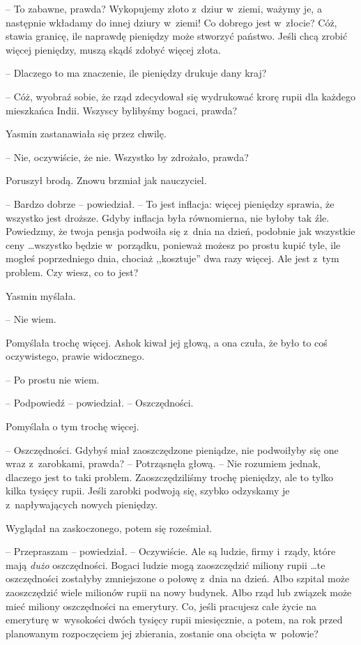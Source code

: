 \documentclass[oneside,polish,11pt,rmheadings]{mwbk}
\begin{document}
-- To zabawne, prawda? Wykopujemy złoto z~dziur w~ziemi, ważymy je, a następnie wkładamy do innej dziury w~ziemi! Co dobrego jest w~złocie? Cóż, stawia granicę, ile naprawdę pieniędzy może stworzyć państwo. Jeśli chcą zrobić więcej pieniędzy, muszą skądś zdobyć więcej złota. 

-- Dlaczego to ma znaczenie, ile pieniędzy drukuje dany kraj?

-- Cóż, wyobraź sobie, że rząd zdecydował się wydrukować krorę rupii dla każdego mieszkańca Indii. Wszyscy bylibyśmy bogaci, prawda?

Yasmin zastanawiała się przez chwilę. 

-- Nie, oczywiście, że nie. Wszystko by zdrożało, prawda?

Poruszył brodą. Znowu brzmiał jak nauczyciel. 

-- Bardzo dobrze -- powiedział. -- To jest inflacja: więcej pieniędzy sprawia, że wszystko jest droższe. Gdyby inflacja była równomierna, nie byłoby tak źle. Powiedzmy, że twoja pensja podwoiła się z~dnia na dzień, podobnie jak wszystkie ceny  \ldots  wszystko będzie w~porządku, ponieważ możesz po prostu kupić tyle, ile mogłeś poprzedniego dnia, chociaż ,,kosztuje'' dwa razy więcej. Ale jest z~tym problem. Czy wiesz, co to jest?

Yasmin myślała. 

-- Nie wiem. 

Pomyślała trochę więcej. Ashok kiwał jej głową, a ona czuła, że było to coś oczywistego, prawie widocznego. 

-- Po prostu nie wiem.

-- Podpowiedź -- powiedział. -- Oszczędności. 

Pomyślała o tym trochę więcej. 

-- Oszczędności. Gdybyś miał zaoszczędzone pieniądze, nie podwoiłyby się one wraz z~zarobkami, prawda? -- Potrząsnęła głową. -- Nie rozumiem jednak, dlaczego jest to taki problem. Zaoszczędziliśmy trochę pieniędzy, ale to tylko kilka tysięcy rupii. Jeśli zarobki podwoją się, szybko odzyskamy je z~napływających nowych pieniędzy.

Wyglądał na zaskoczonego, potem się roześmiał. 

-- Przepraszam -- powiedział. -- Oczywiście. Ale są ludzie, firmy i~rządy, które mają \textit{dużo }oszczędności. Bogaci ludzie mogą zaoszczędzić miliony rupii  \ldots  te oszczędności zostałyby zmniejszone o połowę z~dnia na dzień. Albo szpital może zaoszczędzić wiele milionów rupii na nowy budynek. Albo rząd lub związek może mieć miliony oszczędności na emerytury. Co, jeśli pracujesz całe życie na emeryturę w~wysokości dwóch tysięcy rupii miesięcznie, a potem, na rok przed planowanym rozpoczęciem jej zbierania, zostanie ona obcięta w~połowie? 
\end{document}
